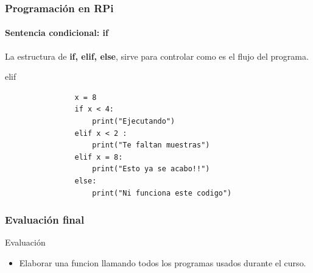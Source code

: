 \documentclass{beamer}
\begin{document}
	\begin{frame}[fragile]
		\frametitle{Programación en RPi}
		\framesubtitle{Sentencia condicional: if}
		La estructura de \textbf{if, elif, else}, sirve para controlar como es el flujo del programa.
		
		\begin{mybox}{elif}
			\begin{lstlisting}
				x = 8
				if x < 4:
					print("Ejecutando")
				elif x < 2 :
					print("Te faltan muestras")
				elif x = 8:
					print("Esto ya se acabo!!")
				else:
					print("Ni funciona este codigo")
			\end{lstlisting}
		\end{mybox}
		
	\end{frame}
	\begin{frame}
		\frametitle{Evaluación final}
			\begin{mybox}{Evaluación}
				\begin{itemize}
					\item Elaborar una funcion llamando todos los programas usados durante el curso.
				\end{itemize}
			\end{mybox}
	\end{frame}
\end{document}
